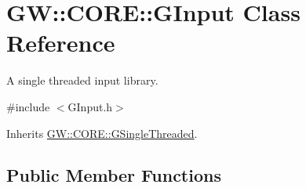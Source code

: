 \hypertarget{class_g_w_1_1_c_o_r_e_1_1_g_input}{}\section{GW\+:\+:C\+O\+RE\+:\+:G\+Input Class Reference}
\label{class_g_w_1_1_c_o_r_e_1_1_g_input}


A single threaded input library.  




{\ttfamily \#include $<$G\+Input.\+h$>$}



Inherits \hyperlink{class_g_w_1_1_c_o_r_e_1_1_g_single_threaded}{G\+W\+::\+C\+O\+R\+E\+::\+G\+Single\+Threaded}.

\subsection*{Public Member Functions}
